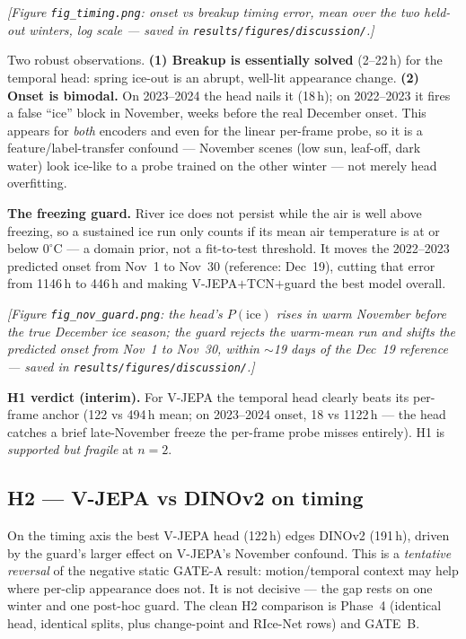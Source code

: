 \documentclass[11pt]{article}
\newcommand{\hh}[1]{\textbf{\color{black!80}#1}}
\begin{document}
\textit{[Figure \texttt{fig\_timing.png}: onset vs breakup timing error, mean over the two
held-out winters, log scale --- saved in \texttt{results/figures/discussion/}.]}

Two robust observations. \hh{(1) Breakup is essentially solved} (2--22\,h) for the temporal head:
spring ice-out is an abrupt, well-lit appearance change. \hh{(2) Onset is bimodal.} On 2023--2024
the head nails it (18\,h); on 2022--2023 it fires a false ``ice'' block in November, weeks before
the real December onset. This appears for \emph{both} encoders and even for the linear per-frame
probe, so it is a feature/label-transfer confound --- November scenes (low sun, leaf-off, dark
water) look ice-like to a probe trained on the other winter --- not merely head overfitting.

\textbf{The freezing guard.} River ice does not persist while the air is well above freezing, so a
sustained ice run only counts if its mean air temperature is at or below $0^\circ$C --- a domain
prior, not a fit-to-test threshold. It moves the 2022--2023 predicted onset from Nov~1 to Nov~30
(reference: Dec~19), cutting that error from 1146\,h to 446\,h and making V-JEPA$+$TCN$+$guard the
best model overall.

\textit{[Figure \texttt{fig\_nov\_guard.png}: the head's $P(\text{ice})$ rises in warm November
before the true December ice season; the guard rejects the warm-mean run and shifts the predicted
onset from Nov~1 to Nov~30, within $\sim$19 days of the Dec~19 reference --- saved in
\texttt{results/figures/discussion/}.]}

\textbf{H1 verdict (interim).} For V-JEPA the temporal head clearly beats its per-frame anchor
(122 vs 494\,h mean; on 2023--2024 onset, 18 vs 1122\,h --- the head catches a brief late-November
freeze the per-frame probe misses entirely). H1 is \emph{supported but fragile} at $n=2$.

\subsection{H2 --- V-JEPA vs DINOv2 on timing}
On the timing axis the best V-JEPA head (122\,h) edges DINOv2 (191\,h), driven by the guard's
larger effect on V-JEPA's November confound. This is a \emph{tentative reversal} of the negative
static GATE-A result: motion/temporal context may help where per-clip appearance does not. It is
not decisive --- the gap rests on one winter and one post-hoc guard. The clean H2 comparison is
Phase~4 (identical head, identical splits, plus change-point and RIce-Net rows) and GATE~B.
\end{document}
